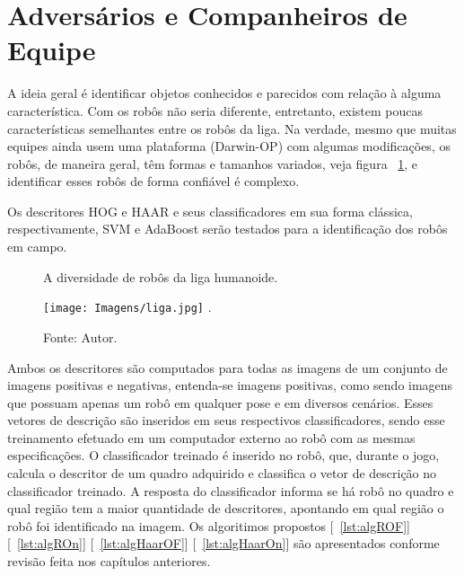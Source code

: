 \section{Adversários e Companheiros de Equipe}
\label{Robos}

A ideia geral é identificar objetos conhecidos e parecidos com relação à alguma característica. Com os robôs não seria diferente, entretanto, existem poucas características semelhantes entre os robôs da liga. Na verdade, mesmo que muitas equipes ainda usem uma plataforma (Darwin-OP) \cite{Darwin} com algumas modificações, os robôs, de maneira geral, têm formas e tamanhos variados, veja figura ~\ref{Fig:DivRob},  e identificar esses robôs de forma confiável é complexo. 

Os descritores HOG e HAAR e seus classificadores em sua forma clássica, respectivamente, SVM e AdaBoost serão testados para a identificação dos robôs em campo. 


\begin{figure}[!h!]
\centering \caption{A diversidade de robôs da liga humanoide.}
\texttt{[image: Imagens/liga.jpg]}
\DeclareGraphicsExtensions.
\caption*{Fonte: Autor.}
\label{Fig:DivRob}
\end{figure}

Ambos os descritores são computados para todas as imagens de um conjunto de imagens positivas e negativas, entenda-se imagens positivas, como sendo imagens que possuam apenas um robô em qualquer pose e em diversos cenários. 
Esses vetores de descrição são inseridos em seus respectivos classificadores, sendo esse treinamento efetuado em um computador externo ao robô com as mesmas especificações. O classificador treinado é inserido no robô, que, durante o jogo, calcula o descritor de um quadro adquirido e classifica o vetor de descrição no classificador treinado. A resposta do classificador informa se há robô no quadro e qual região tem a maior quantidade de descritores, apontando em qual região o robô foi identificado na imagem. Os algoritimos propostos [~\ref{lst:algROF}] [~\ref{lst:algROn}] [~\ref{lst:algHaarOF}] [~\ref{lst:algHaarOn}] são apresentados conforme revisão feita nos capítulos anteriores.


